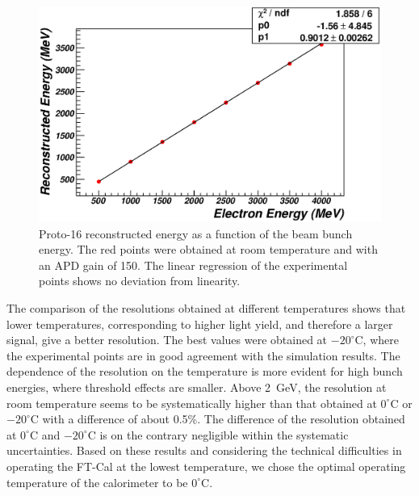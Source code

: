 \begin{figure}
\includegraphics[width=1.0\columnwidth]{fig/btf_linearity_1876_2_6.eps}
\caption{Proto-16 reconstructed energy as a function of the beam bunch energy. The red points were obtained at
  room temperature and with an APD gain of 150. The linear regression of the experimental points shows no deviation
  from linearity.}
\label{fig:btf_linearity}
\end{figure}

The comparison of the resolutions obtained at different temperatures shows that lower temperatures,
corresponding to higher light yield, and therefore a larger signal, give a better resolution. The best values were
obtained at $-20^{\circ}$C, where the experimental points are in good agreement with the simulation results. The
dependence of the resolution on the temperature is more evident for high bunch energies, where threshold
effects are smaller. Above 2~GeV, the resolution at room temperature seems to be systematically higher than that
obtained at $0^\circ$C or $-20^\circ$C with a difference of about 0.5\%. The difference of the resolution obtained
at $0^\circ$C and $-20^\circ$C is on the contrary negligible within the systematic uncertainties. Based
on these results and considering the technical difficulties in operating the FT-Cal at the lowest temperature, we
chose the optimal operating temperature of the calorimeter to be $0^\circ$C.

